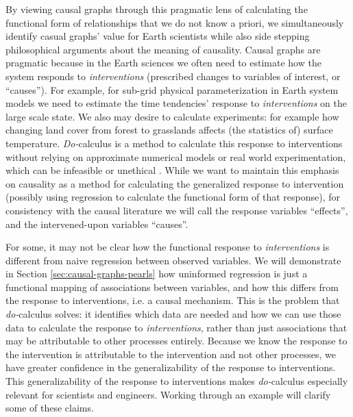 \documentclass[12pt]{article}
\begin{document}
By viewing causal graphs through this pragmatic lens of calculating
the functional form of relationships that we do not know a priori, we
simultaneously identify casual graphs' value for Earth scientists
while also side stepping philosophical arguments about the meaning of
causality. Causal graphs are pragmatic because in the Earth sciences
we often need to estimate how the system responds to
\emph{interventions} (prescribed changes to variables of interest, or
``causes''). For example, for sub-grid physical parameterization in
Earth system models we need to estimate the time tendencies' response
to \emph{interventions} on the large scale state. We also may desire
to calculate experiments: for example how changing land cover from
forest to grasslands affects (the statistics of) surface
temperature. \textit{Do-}calculus is a method to calculate this
response to interventions without relying on approximate numerical
models or real world experimentation, which can be infeasible or
unethical \citep[as is the case for geoengineering; e.g., unilateral
decisions to seed the oceans with iron, or spray aerosols in the
atmosphere,][]{hamilton2013no}. While we want to maintain this
emphasis on causality as a method for calculating the generalized
response to intervention (possibly using regression to calculate the
functional form of that response), for consistency with the causal
literature we will call the response variables ``effects'', and the
intervened-upon variables ``causes''.

For some, it may not be clear how the functional response to
\emph{interventions} is different from naive regression between
observed variables. We will demonstrate in Section
\ref{sec:causal-graphs-pearls} how uninformed regression is just a
functional mapping of associations between variables, and how this
differs from the response to interventions, i.e. a causal
mechanism. This is the problem that \textit{do-}calculus solves: it
identifies which data are needed and how we can use those data to
calculate the response to \emph{interventions}, rather than just
associations that may be attributable to other processes
entirely. Because we know the response to the intervention is
attributable to the intervention and not other processes, we have
greater confidence in the generalizability of the response to
interventions.  This generalizability of the response to interventions
makes \textit{do-}calculus especially relevant for scientists and
engineers. Working through an example will clarify some of these
claims.
\end{document}
